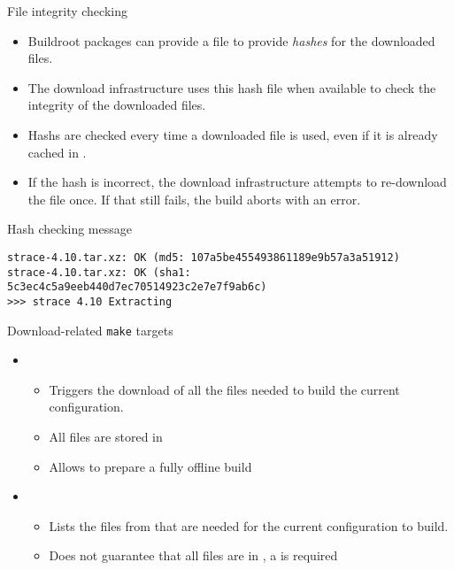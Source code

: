 \begin{frame}[fragile]{File integrity checking}
  \begin{itemize}
  \item Buildroot packages can provide a  file to provide
    {\em hashes} for the downloaded files.
  \item The download infrastructure uses this hash file when available
    to check the integrity of the downloaded files.
  \item Hashs are checked every time a downloaded file is used, even
    if it is already cached in .
  \item If the hash is incorrect, the download infrastructure attempts
    to re-download the file once. If that still fails, the build
    aborts with an error.
  \end{itemize}

  \begin{block}{Hash checking message}
{\scriptsize
\begin{verbatim}
strace-4.10.tar.xz: OK (md5: 107a5be455493861189e9b57a3a51912)
strace-4.10.tar.xz: OK (sha1: 5c3ec4c5a9eeb440d7ec70514923c2e7e7f9ab6c)
>>> strace 4.10 Extracting
\end{verbatim}}
  \end{block}
\end{frame}

\begin{frame}{Download-related {\tt make} targets}
  \begin{itemize}
  \item {}
    \begin{itemize}
    \item Triggers the download of all the files needed to build the
      current configuration.
    \item All files are stored in 
    \item Allows to prepare a fully offline build
    \end{itemize}
  \item {}
    \begin{itemize}
    \item Lists the files from  that are needed for
      the current configuration to build.
    \item Does not guarantee that all files are in , a
       is required
    \end{itemize}
  \end{itemize}
\end{frame}
